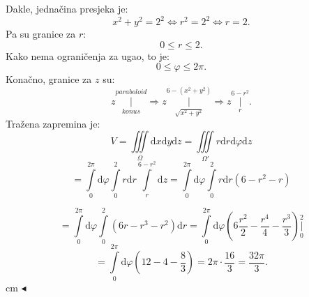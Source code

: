 \documentclass[a4paper,11pt]{article}
\begin{document}
Dakle, jednačina presjeka je: $$x^2 + y^2 = 2^2  \Longleftrightarrow r^2 = 2^2 \Longleftrightarrow r=2. $$
Pa su granice za $r:$
$$0\leq r \leq 2.$$
Kako nema ograničenja za ugao, to je:
$$0\leq \varphi \leq 2\pi.$$
Konačno, granice za $z$ su:
$$z \underset{konus}{\overset{ paraboloid }{ \bigg\vert}} \Rightarrow z \underset{\sqrt{x^2 + y^2}}{\overset{ 6 - (x^2 + y^2 )}{ \bigg\vert}} \Rightarrow z \underset{r }{\overset{ 6 - r^2  }{ \bigg\vert}}.$$
Tražena zapremina je:
$$V =\iiint \limits_{\Omega}    \mathrm dx \mathrm dy \mathrm dz = \iiint \limits_{\Omega'}    r \mathrm dr \mathrm d\varphi \mathrm dz $$
$$= \int\limits_{0}^{2\pi} \mathrm d\varphi \int\limits_{0}^{2} r\mathrm dr \int\limits_{  r  }^{   6 - r^2 }   \mathrm dz=  \int\limits_{0}^{2\pi} \mathrm d\varphi \int\limits_{0}^{2 } r\mathrm dr(6-r^2 - r )  $$

$$=\int\limits_{0}^{2\pi} \mathrm d\varphi \int\limits_{0}^{2 } (6r - r^3 - r^2  )\mathrm dr     =  \int\limits_{0}^{2\pi} \mathrm d\varphi \left( 6\frac{ r^2  }{2} -  \frac{ r^4  }{4} - \frac{ r^3  }{3} \right)\underset{0}{\overset{ 2}{ \bigg\vert}}   $$
$$= \int\limits_{0}^{2\pi} \mathrm d\varphi\left(12 - 4 - \frac{ 8}{3}  \right) = 2\pi \cdot \frac{16 }{3} = \frac{32\pi}{3} .$$
 cm $\blacktriangleleft$ \\
\end{document}
